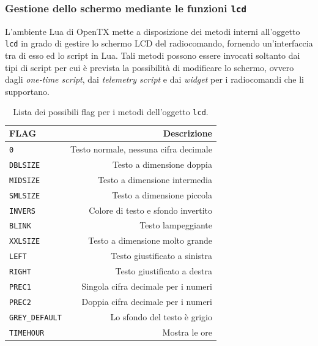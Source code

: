 \documentclass[a4paper, 12pt]{report} %
\begin{document}
\subsubsection{Gestione dello schermo mediante le funzioni \texttt{lcd}}\label{section:funzioni-lcd}
L'ambiente Lua di OpenTX mette a disposizione dei metodi interni all'oggetto \texttt{lcd} in grado di gestire lo schermo LCD del radiocomando, fornendo un'interfaccia tra di esso ed lo script in Lua. Tali metodi possono essere invocati soltanto dai tipi di script per cui è prevista la possibilità di modificare lo schermo, ovvero dagli \emph{one-time script}, dai \emph{telemetry script} e dai \emph{widget} per i radiocomandi che li supportano.

\begin{table}[ht]
        \begin{center}
                \begin{tabular}{|l|r|}
                        \hline
                        \textbf{FLAG} & \textbf{Descrizione}\\
                        \hline
                        \hline
                        \texttt{0} & Testo normale, nessuna cifra decimale\\
                        \hline
                        \texttt{DBLSIZE} & Testo a dimensione doppia\\
                        \hline
                        \texttt{MIDSIZE} & Testo a dimensione intermedia\\
                        \hline
                        \texttt{SMLSIZE} & Testo a dimensione piccola\\
                        \hline
                        \texttt{INVERS} & Colore di testo e sfondo invertito\\
                        \hline
                        \texttt{BLINK} & Testo lampeggiante\\
                        \hline
                        \texttt{XXLSIZE} & Testo a dimensione molto grande\\
                        \hline
                        \texttt{LEFT} & Testo giustificato a sinistra\\
                        \hline
                        \texttt{RIGHT} & Testo giustificato a destra\\
                        \hline
                        \texttt{PREC1} & Singola cifra decimale per i numeri\\
                        \hline
                        \texttt{PREC2} & Doppia cifra decimale per i numeri\\
                        \hline
                        \texttt{GREY\_DEFAULT} & Lo sfondo del testo è grigio\\
                        \hline
                        \texttt{TIMEHOUR} & Mostra le ore\\
                        \hline
                \end{tabular}
        \end{center}
        \caption{Lista dei possibili flag per i metodi dell'oggetto \texttt{lcd}.}
        \label{tab:elenco-flag-lcd}
\end{table}
\end{document}
